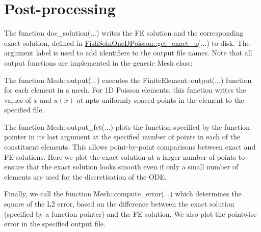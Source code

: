  

\hypertarget{index_doc}{}\section{Post-\/processing}\label{index_doc}
The function {\ttfamily doc\+\_\+solution}(...) writes the FE solution and the corresponding exact solution, defined in {\ttfamily \hyperlink{namespaceFishSolnOneDPoisson_a52c9346f567cb68fe20268a592deb4bc}{Fish\+Soln\+One\+D\+Poisson\+::get\+\_\+exact\+\_\+u}}(...) to disk. The argument {\ttfamily label} is used to add identifiers to the output file names. Note that all output functions are implemented in the generic {\ttfamily Mesh} class\+:
\begin{DoxyItemize}
\item The function {\ttfamily Mesh\+::output}(...) executes the {\ttfamily Finite\+Element\+::output}(...) function for each element in a mesh. For 1D Poisson elements, this function writes the values of $ x $ and $ u(x) $ at {\ttfamily npts} uniformly spaced points in the element to the specified file.
\item The function {\ttfamily Mesh\+::output\+\_\+fct}(...) plots the function specified by the function pointer in its last argument at the specified number of points in each of the constituent elements. This allows point-\/by-\/point comparisons between exact and FE solutions. Here we plot the exact solution at a larger number of points to ensure that the exact solution looks smooth even if only a small number of elements are used for the discretisation of the O\+DE.
\end{DoxyItemize}Finally, we call the function {\ttfamily Mesh\+::compute\+\_\+error}(...) which determines the square of the L2 error, based on the difference between the exact solution (specified by a function pointer) and the FE solution. We also plot the pointwise error in the specified output file.


